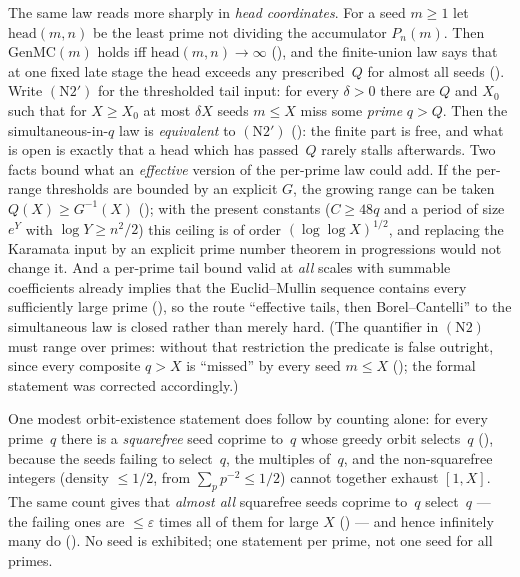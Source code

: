 \begin{remark}
The same law reads more sharply in \emph{head coordinates}.  For a seed
$m\ge 1$ let $\mathrm{head}(m,n)$ be the least prime not dividing the
accumulator $P_n(m)$.  Then $\mathrm{GenMC}(m)$ holds iff $\mathrm{head}(m,n)\to\infty$
(), and the
finite-union law says that at one fixed late stage the head exceeds any
prescribed~$Q$ for almost all seeds
().  Write
$(\mathrm{N2}')$ for the thresholded tail input: for every $\delta>0$ there
are $Q$ and $X_0$ such that for $X\ge X_0$ at most $\delta X$ seeds $m\le X$
miss some \emph{prime} $q>Q$.  Then the simultaneous-in-$q$ law is
\emph{equivalent} to $(\mathrm{N2}')$
(): the
finite part is free, and what is open is exactly that a head which has
passed~$Q$ rarely stalls afterwards.  Two facts bound what an
\emph{effective} version of the per-prime law could add.  If the per-range
thresholds are bounded by an explicit $G$, the growing range can be taken
$Q(X)\ge G^{-1}(X)$
(); with the present
constants ($C\ge 48q$ and a period of size $e^{Y}$ with $\log Y\ge n^2/2$)
this ceiling is of order $(\log\log X)^{1/2}$, and replacing the Karamata
input by an explicit prime number theorem in progressions would not change
it.  And a per-prime tail bound valid at \emph{all} scales with summable
coefficients already implies that the Euclid--Mullin sequence contains every
sufficiently large prime
(), so the
route ``effective tails, then Borel--Cantelli'' to the simultaneous law is
closed rather than merely hard.  (The quantifier in $(\mathrm{N2})$ must
range over primes: without that restriction the predicate is false outright,
since every composite $q>X$ is ``missed'' by every seed $m\le X$
();
the formal statement was corrected accordingly.)

One modest orbit-existence statement does follow by counting alone: for
every prime~$q$ there is a \emph{squarefree} seed coprime to~$q$ whose
greedy orbit selects~$q$
(),
because the seeds failing to select~$q$, the multiples of~$q$, and the
non-squarefree integers (density $\le 1/2$, from $\sum_p p^{-2} \le 1/2$)
cannot together exhaust $[1,X]$.  The same count gives that \emph{almost
all} squarefree seeds coprime to~$q$ select~$q$ --- the failing ones are
$\le \varepsilon$ times all of them for large $X$
()
--- and hence infinitely many do
().
No seed is exhibited; one statement per prime, not one seed for all primes.


\end{remark}
